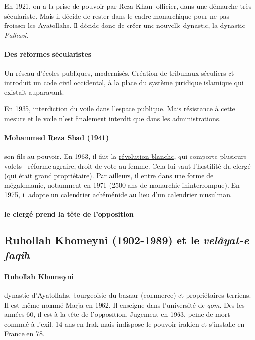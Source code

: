     En 1921, on a la prise de pouvoir par Reza Khan, officier, dans une démarche très séculariste. Mais il décide de rester dans le cadre monarchique pour ne pas froisser les Ayatollahs. Il décide donc de créer une nouvelle dynastie, la dynastie \textit{Palhavi}.
    
    \paragraph{Des réformes sécularistes} Un réseau d'écoles publiques, modernisés. Création de tribunaux séculiers et introduit un code civil occidental, à la place du système juridique islamique qui existait auparavant.
    
    En 1935, interdiction du voile dans l'espace publique. Mais résistance à cette mesure et le voile n'est finalement interdit que dans les administrations.
    
    \paragraph{Mohammed Reza Shad (1941)} son fils au pouvoir. En 1963, il fait la \href{https://fr.wikipedia.org/wiki/R\%C3\%A9volution_blanche}{révolution blanche}, qui comporte plusieurs volets : réforme agraire, droit de vote au femme. Cela lui vaut l'hostilité du clergé (qui était grand propriétaire). Par ailleurs, il entre dans une forme de mégalomanie, notamment en 1971 (2500 ans de monarchie ininterrompue). 
    En 1975, il adopte un calendrier achéménide au lieu d'un calendrier musulman. 

    \paragraph{le clergé prend la tête de l'opposition}
    
   \subsection{Ruhollah Khomeyni (1902-1989) et le \emph{velâyat-e faqih}}
    
    \paragraph{Ruhollah Khomeyni }  dynastie d'Ayatollahs, bourgeoisie du bazaar (commerce) et propriétaires terriens. Il est même nommé Marja en 1962. Il enseigne dans l'université de \textit{qom}. Dès les années 60, il est à la tête de l'opposition. Jugement en 1963, peine de mort commué à l'exil. 14 ans en Irak mais indispose le pouvoir irakien et s'installe en France en 78.
    
